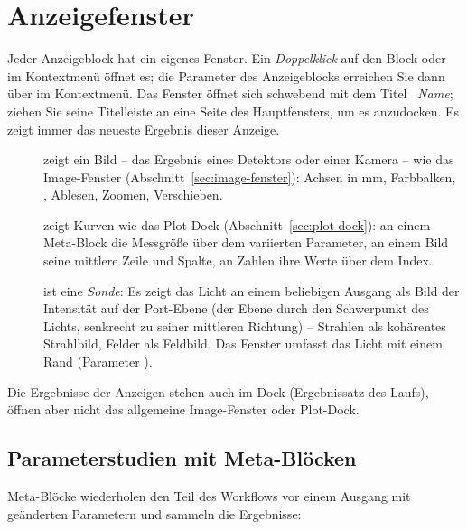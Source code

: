 \section{Anzeigefenster}\label{sec:workflow-anzeigen}

Jeder Anzeigeblock hat ein eigenes Fenster. Ein \emph{Doppelklick} auf den Block oder
 im Kontextmenü öffnet es; die Parameter des Anzeigeblocks erreichen Sie dann
über  im Kontextmenü. Das Fenster öffnet sich schwebend mit dem Titel
~\textit{Name}; ziehen Sie seine Titelleiste an eine Seite des Hauptfensters, um es
anzudocken. Es zeigt immer das neueste Ergebnis dieser Anzeige.

\begin{description}
  \item[] zeigt ein Bild – das Ergebnis eines Detektors oder einer
        Kamera – wie das Image-Fenster
        (Abschnitt~\ref{sec:image-fenster}): Achsen in mm, Farbbalken, , Ablesen,
        Zoomen, Verschieben.
  \item[] zeigt Kurven wie das Plot-Dock (Abschnitt~\ref{sec:plot-dock}):
        an einem Meta-Block die Messgröße über dem variierten Parameter, an einem Bild seine
        mittlere Zeile und Spalte, an Zahlen ihre Werte über dem Index.
  \item[] ist eine \emph{Sonde}: Es zeigt das Licht an einem beliebigen
        Ausgang als Bild der Intensität auf der Port-Ebene (der Ebene durch den Schwerpunkt des
        Lichts, senkrecht zu seiner mittleren Richtung) – Strahlen als kohärentes Strahlbild,
        Felder als Feldbild. Das Fenster umfasst das Licht mit einem Rand (Parameter
        ).
\end{description}

Die Ergebnisse der Anzeigen stehen auch im Dock  (Ergebnissatz des Laufs), öffnen
aber nicht das allgemeine Image-Fenster oder Plot-Dock.

\subsection{Parameterstudien mit Meta-Blöcken}\label{sec:workflow-meta}

Meta-Blöcke wiederholen den Teil des Workflows vor einem Ausgang mit geänderten Parametern und
sammeln die Ergebnisse:

